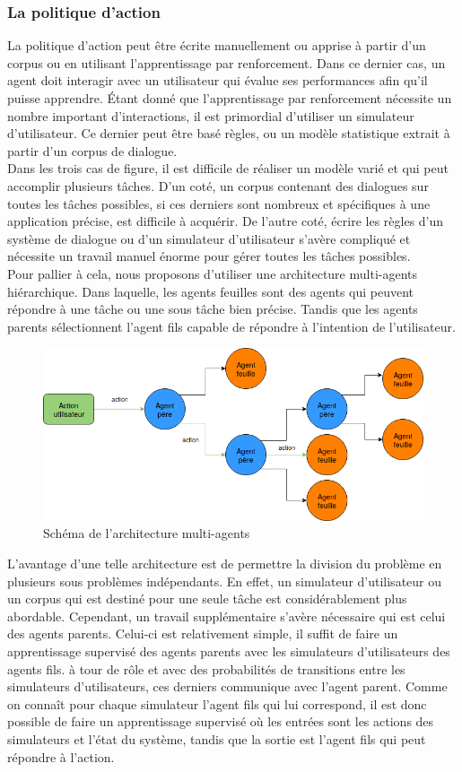\subsubsection{La politique d'action}
La politique d'action peut être écrite manuellement ou apprise à partir d'un corpus ou en utilisant l'apprentissage par renforcement. Dans ce dernier cas, un agent doit interagir avec un utilisateur qui évalue ses performances afin qu'il puisse apprendre. Étant donné que l'apprentissage par renforcement nécessite un nombre important d'interactions, il est primordial d'utiliser un simulateur d'utilisateur. Ce dernier peut être basé règles, ou un modèle statistique extrait à partir d'un corpus de dialogue.\\
Dans les trois cas de figure, il est difficile de réaliser un modèle varié et qui peut accomplir plusieurs tâches. D'un coté, un corpus contenant des dialogues sur toutes les tâches possibles, si ces derniers sont nombreux et spécifiques à une application précise, est difficile à acquérir. De l'autre coté, écrire les règles d'un système de dialogue ou d'un simulateur d'utilisateur s'avère compliqué et nécessite un travail manuel énorme pour gérer toutes les tâches possibles.\\
Pour pallier à cela, nous proposons d'utiliser une architecture multi-agents hiérarchique. Dans laquelle, les agents feuilles sont des agents qui peuvent répondre à une tâche ou une sous tâche bien précise. Tandis que les agents parents sélectionnent l'agent fils capable de répondre à l'intention de l'utilisateur.
\begin{figure}[H] 
	
	\centering
	\includegraphics[width=0.6\linewidth]{images/Conception/DM/multiagent.png}
	\caption{Schéma de l'architecture multi-agents}
\end{figure}\label{multiagent}
L'avantage d'une telle architecture est de permettre la division du problème en plusieurs sous problèmes indépendants. En effet, un simulateur d'utilisateur ou un corpus qui est destiné pour une seule tâche est considérablement plus abordable.  Cependant, un travail supplémentaire s'avère nécessaire qui est celui des agents parents. Celui-ci est relativement simple, il suffit de faire un apprentissage supervisé des agents parents avec les simulateurs d'utilisateurs des agents fils. à tour de rôle et avec des probabilités de transitions entre les simulateurs d'utilisateurs, ces derniers communique avec l'agent parent. Comme on connaît pour chaque simulateur l'agent fils qui lui correspond, il est donc possible de faire un apprentissage supervisé où les entrées sont les actions des simulateurs et l'état du système, tandis que la sortie est l'agent fils qui peut répondre à l'action.
